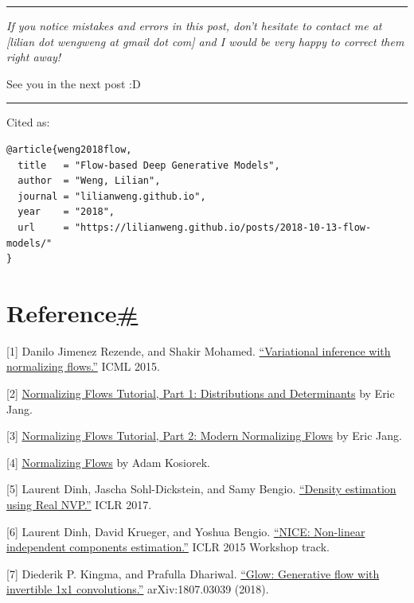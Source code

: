 \begin{center}\rule{0.5\linewidth}{0.5pt}\end{center}

\emph{If you notice mistakes and errors in this post, don't hesitate to contact me at {[}lilian dot wengweng at gmail dot com{]} and I would be very happy to correct them right away!}

See you in the next post :D

\begin{center}\rule{0.5\linewidth}{0.5pt}\end{center}

Cited as:

\begin{verbatim}
@article{weng2018flow,
  title   = "Flow-based Deep Generative Models",
  author  = "Weng, Lilian",
  journal = "lilianweng.github.io",
  year    = "2018",
  url     = "https://lilianweng.github.io/posts/2018-10-13-flow-models/"
}
\end{verbatim}

\section{\texorpdfstring{Reference\hyperref[reference]{\#}}{Reference\#}}\label{reference}

{[}1{]} Danilo Jimenez Rezende, and Shakir Mohamed. \href{https://arxiv.org/abs/1505.05770}{``Variational inference with normalizing flows.''} ICML 2015.

{[}2{]} \href{https://blog.evjang.com/2018/01/nf1.html}{Normalizing Flows Tutorial, Part 1: Distributions and Determinants} by Eric Jang.

{[}3{]} \href{https://blog.evjang.com/2018/01/nf2.html}{Normalizing Flows Tutorial, Part 2: Modern Normalizing Flows} by Eric Jang.

{[}4{]} \href{http://akosiorek.github.io/ml/2018/04/03/norm_flows.html}{Normalizing Flows} by Adam Kosiorek.

{[}5{]} Laurent Dinh, Jascha Sohl-Dickstein, and Samy Bengio. \href{https://arxiv.org/abs/1605.08803}{``Density estimation using Real NVP.''} ICLR 2017.

{[}6{]} Laurent Dinh, David Krueger, and Yoshua Bengio. \href{https://arxiv.org/abs/1410.8516}{``NICE: Non-linear independent components estimation.''} ICLR 2015 Workshop track.

{[}7{]} Diederik P. Kingma, and Prafulla Dhariwal. \href{https://arxiv.org/abs/1807.03039}{``Glow: Generative flow with invertible 1x1 convolutions.''} arXiv:1807.03039 (2018).

